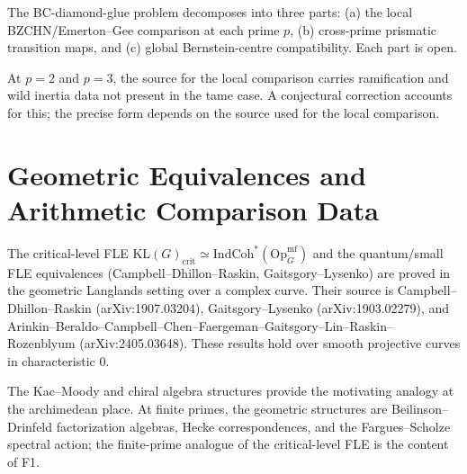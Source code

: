 \begin{remark}
\label{v4-arith:fle-comparison:rem:bc-diamond-glue}
The BC-diamond-glue problem decomposes into three parts: (a) the
local BZCHN/Emerton--Gee comparison at each prime \(p\), (b)
cross-prime prismatic transition maps, and (c) global
Bernstein-centre compatibility. Each part is open.
\end{remark}

\begin{remark}
\label{v4-arith:fle-comparison:rem:wild-prime}
At \(p = 2\) and \(p = 3\), the source for the local comparison
carries ramification and wild inertia data not present in the tame
case. A conjectural correction accounts for this; the precise form
depends on the source used for the local comparison.
\end{remark}

\section{Geometric Equivalences and Arithmetic Comparison Data}
\label{v4-arith:fle-comparison:form-matrix}

\begin{theorem}
\label{v4-arith:fle-comparison:thm:geometric-fle-form}
The critical-level FLE
\(\mathrm{KL}(G)_{\mathrm{crit}} \simeq
\mathrm{IndCoh}^{*}(\mathrm{Op}^{\mathrm{mf}}_{\check G})\) and the
quantum/small FLE equivalences (Campbell--Dhillon--Raskin,
Gaitsgory--Lysenko) are proved in the geometric Langlands setting over
a complex curve. Their source is Campbell--Dhillon--Raskin
(arXiv:1907.03204), Gaitsgory--Lysenko (arXiv:1903.02279), and
Arinkin--Beraldo--Campbell--Chen--Faergeman--Gaitsgory--Lin--Raskin--%
Rozenblyum (arXiv:2405.03648). These results hold over smooth
projective curves in characteristic \(0\).
\end{theorem}

\begin{remark}
\label{v4-arith:fle-comparison:rem:chiral-domain}
The Kac--Moody and chiral algebra structures provide the motivating
analogy at the archimedean place. At finite primes, the geometric
structures are Beilinson--Drinfeld factorization algebras,
Hecke correspondences, and the Fargues--Scholze spectral action; the
finite-prime analogue of the critical-level FLE is the content of F1.
\end{remark}


